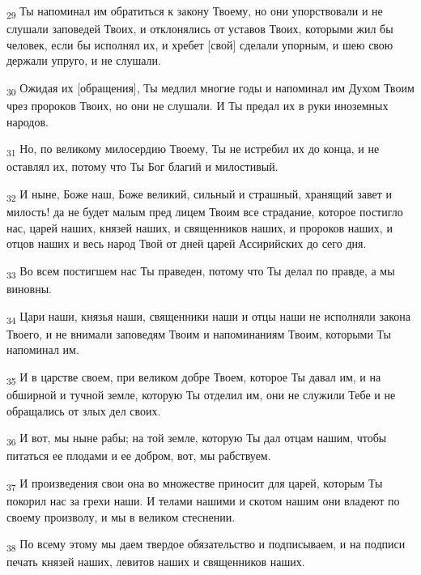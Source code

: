 \begin{tcolorbox}
\textsubscript{29} Ты напоминал им обратиться к закону Твоему, но они упорствовали и не слушали заповедей Твоих, и отклонялись от уставов Твоих, которыми жил бы человек, если бы исполнял их, и хребет [свой] сделали упорным, и шею свою держали упруго, и не слушали.
\end{tcolorbox}
\begin{tcolorbox}
\textsubscript{30} Ожидая их [обращения], Ты медлил многие годы и напоминал им Духом Твоим чрез пророков Твоих, но они не слушали. И Ты предал их в руки иноземных народов.
\end{tcolorbox}
\begin{tcolorbox}
\textsubscript{31} Но, по великому милосердию Твоему, Ты не истребил их до конца, и не оставлял их, потому что Ты Бог благий и милостивый.
\end{tcolorbox}
\begin{tcolorbox}
\textsubscript{32} И ныне, Боже наш, Боже великий, сильный и страшный, хранящий завет и милость! да не будет малым пред лицем Твоим все страдание, которое постигло нас, царей наших, князей наших, и священников наших, и пророков наших, и отцов наших и весь народ Твой от дней царей Ассирийских до сего дня.
\end{tcolorbox}
\begin{tcolorbox}
\textsubscript{33} Во всем постигшем нас Ты праведен, потому что Ты делал по правде, а мы виновны.
\end{tcolorbox}
\begin{tcolorbox}
\textsubscript{34} Цари наши, князья наши, священники наши и отцы наши не исполняли закона Твоего, и не внимали заповедям Твоим и напоминаниям Твоим, которыми Ты напоминал им.
\end{tcolorbox}
\begin{tcolorbox}
\textsubscript{35} И в царстве своем, при великом добре Твоем, которое Ты давал им, и на обширной и тучной земле, которую Ты отделил им, они не служили Тебе и не обращались от злых дел своих.
\end{tcolorbox}
\begin{tcolorbox}
\textsubscript{36} И вот, мы ныне рабы; на той земле, которую Ты дал отцам нашим, чтобы питаться ее плодами и ее добром, вот, мы рабствуем.
\end{tcolorbox}
\begin{tcolorbox}
\textsubscript{37} И произведения свои она во множестве приносит для царей, которым Ты покорил нас за грехи наши. И телами нашими и скотом нашим они владеют по своему произволу, и мы в великом стеснении.
\end{tcolorbox}
\begin{tcolorbox}
\textsubscript{38} По всему этому мы даем твердое обязательство и подписываем, и на подписи печать князей наших, левитов наших и священников наших.
\end{tcolorbox}
